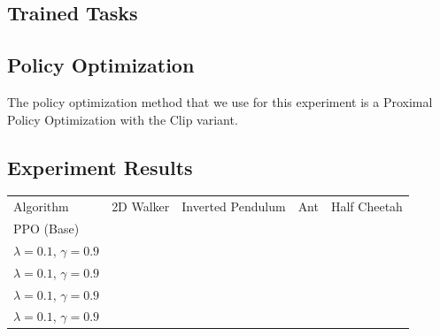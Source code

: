 \subsection{Trained Tasks}

\subsection{Policy Optimization}
\label{subsec:po}
The policy optimization method that we use for this experiment is a Proximal Policy Optimization with the Clip variant.





\subsection{Experiment Results}

\begin{tabular}{p{14mm}p{14mm}p{15mm}p{11mm}p{14mm}}
Algorithm & 2D Walker & Inverted Pendulum & Ant & Half Cheetah\\
PPO (Base) & & & &  \\
\hline
$\lambda=0.1$, $\gamma=0.9$ & & & &  \\ 
\hline
$\lambda=0.1$, $\gamma=0.9$& & & &  \\ 
\hline
$\lambda=0.1$, $\gamma=0.9$& & & &  \\ 
\hline
$\lambda=0.1$, $\gamma=0.9$& & & &  \\
\end{tabular}


